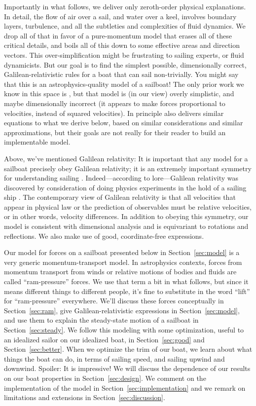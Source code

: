 \documentclass[letterpaper]{article}
\newcommand{\secref}[1]{Section~\ref{#1}}
\begin{document}
Importantly in what follows, we deliver only zeroth-order physical explanations.
In detail, the flow of air over a sail, and water over a keel, involves boundary layers, turbulence, and all the subtleties and complexities of fluid dynamics.
We drop all of that in favor of a pure-momentum model that erases all of these critical details, and boils all of this down to some effective areas and direction vectors.
This over-simplification might be frustrating to sailing experts, or fluid dynamicists.
But our goal is to find the simplest possible, dimensionally correct, Galilean-relativistic rules for a boat that can sail non-trivially.
You might say that this is an astrophysics-quality model of a sailboat!
The only prior work we know in this space is \cite{tao}, but that model is (in our view) overly simplistic, and maybe dimensionally incorrect (it appears to make forces proportional to velocities, instead of squared velocities).
In principle also \cite{pos} delivers similar equations to what we derive below, based on similar considerations and similar approximations, but their goals are not really for their reader to build an implementable model.

Above, we've mentioned Galilean relativity:
It is important that any model for a sailboat precisely obey Galilean relativity; it is an extremely important symmetry for understanding sailing \cite{symmetry}.
Indeed---according to lore---Galilean relativity was discovered by consideration of doing physics experiments in the hold of a sailing ship \cite{galileo}.
The contemporary view of Galilean relativity is that all velocities that appear in physical law or the prediction of observables must be relative velocities, or in other words, velocity differences.
In addition to obeying this symmetry, our model is consistent with dimensional analysis and is equivariant to rotations and reflections.
We also make use of good, coordinate-free expressions.

Our model for forces on a sailboat presented below in \secref{sec:model} is a very generic momentum-transport model.
In astrophysics contexts, forces from momentum transport from winds or relative motions of bodies and fluids are called ``ram-pressure'' forces.
We use that term a bit in what follows, but since it means different things to different people, it's fine to substitute in the word ``lift'' for ``ram-pressure'' everywhere.
We'll discuss these forces conceptually in \secref{sec:ram}, give Galilean-relativistic expressions in \secref{sec:model}, and use them to explain the steady-state motion of a sailboat in \secref{sec:steady}.
We follow this modeling with some optimization, useful to an idealized sailor on our idealized boat, in \secref{sec:good} and \secref{sec:better}.
When we optimize the trim of our boat, we learn about what things the boat can do, in terms of sailing speed, and sailing upwind and downwind.
Spoiler: It is impressive!
We will discuss the dependence of our results on our boat properties in \secref{sec:design}.
We comment on the implementation of the model in \secref{sec:implementation} and we remark on limitations and extensions in \secref{sec:discussion}.
\end{document}
